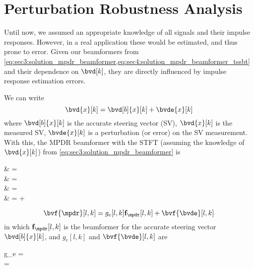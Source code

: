 \section{Perturbation Robustness Analysis}

Until now, we assumed an appropriate knowledge of all signals and their impulse responses. However, in a real application these would be estimated, and thus prone to error. Given our beamformers from \cref{eq:sec3:solution_mpdr_beamformer,eq:sec4:solution_mpdr_beamformer_tssbt} and their dependence on $\bvd[k]$, they are directly influenced by impulse response estimation errors.

We can write
\begin{equation}
	\bvd{x}[k] = \bvd[b]{x}[k] + \bvde{x}[k]
\end{equation}
where $\bvd[b]{x}[k]$ is the accurate steering vector (SV), $\bvd{x}[k]$ is the measured SV, $\bvde{x}[k]$ is a perturbation (or error) on the SV measurement. With this, the MPDR beamformer with the STFT (assuming the knowledge of $\bvd{x}[k]$) from \cref{eq:sec3:solution_mpdr_beamformer} is
\begin{equations}
	\bvf{\mpdr}
	& =  \\
	& =  \\
	& =  \\
	& =  + 
\end{equations}
\begin{equation}
	\label{eq:sec5:beamformer_approx_sv}
	\bvf{\mpdr}[l,k] = g_e[l,k] \bvfb{\mpdr}[l,k] + \bvf{\bvde}[l,k]
\end{equation}
in which $\bvfb{\mpdr}[l,k]$ is the beamformer for the accurate steering vector $\bvd[b]{x}[k]$, and $g_e[l,k]$ and $\bvf{\bvde}[l,k]$ are
\begin{subgather}
	g_e =  \\
	\bvf{\bvde} = 
\end{subgather}

